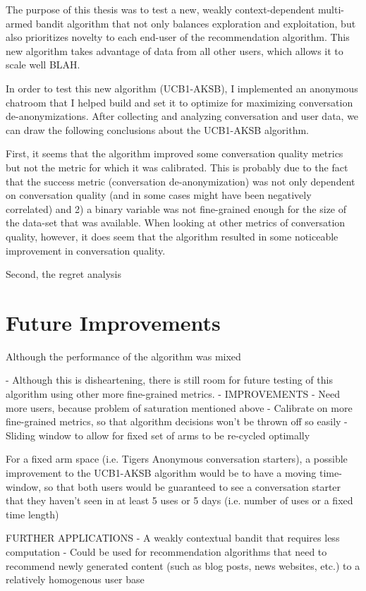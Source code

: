 The purpose of this thesis was to test a new, weakly context-dependent multi-armed bandit algorithm that not only balances exploration and exploitation, but also prioritizes novelty to each end-user of the recommendation algorithm. This new algorithm takes advantage of data from all other users, which allows it to scale well BLAH. 

In order to test this new algorithm (UCB1-AKSB), I implemented an anonymous chatroom that I helped build and set it to optimize for maximizing conversation de-anonymizations. After collecting and analyzing conversation and user data, we can draw the following conclusions about the UCB1-AKSB algorithm. 

First, it seems that the algorithm improved some conversation quality metrics but not the metric for which it was calibrated. This is probably due to the fact that the success metric (conversation de-anonymization) was not only dependent on conversation quality (and in some cases might have been negatively correlated) and 2) a binary variable was not fine-grained enough for the size of the data-set that was available. When looking at other metrics of conversation quality, however, it does seem that the algorithm resulted in some noticeable improvement in conversation quality.

Second, the regret analysis

\section{Future Improvements}

Although the performance of the algorithm was mixed 

- Although this is disheartening, there is still room for future testing of this algorithm using other more fine-grained metrics.
- IMPROVEMENTS
	- Need more users, because problem of saturation mentioned above
	- Calibrate on more fine-grained metrics, so that algorithm decisions won't be thrown off so easily
	- Sliding window to allow for fixed set of arms to be re-cycled optimally

For a fixed arm space (i.e. Tigers Anonymous conversation starters), a possible improvement to the UCB1-AKSB algorithm would be to have a moving time-window, so that both users would be guaranteed to see a conversation starter that they haven't seen in at least 5 uses or 5 days (i.e. number of uses or a fixed time length)

FURTHER APPLICATIONS
- A weakly contextual bandit that requires less computation
- Could be used for recommendation algorithms that need to recommend newly generated content (such as blog posts, news websites, etc.) to a relatively homogenous user base
